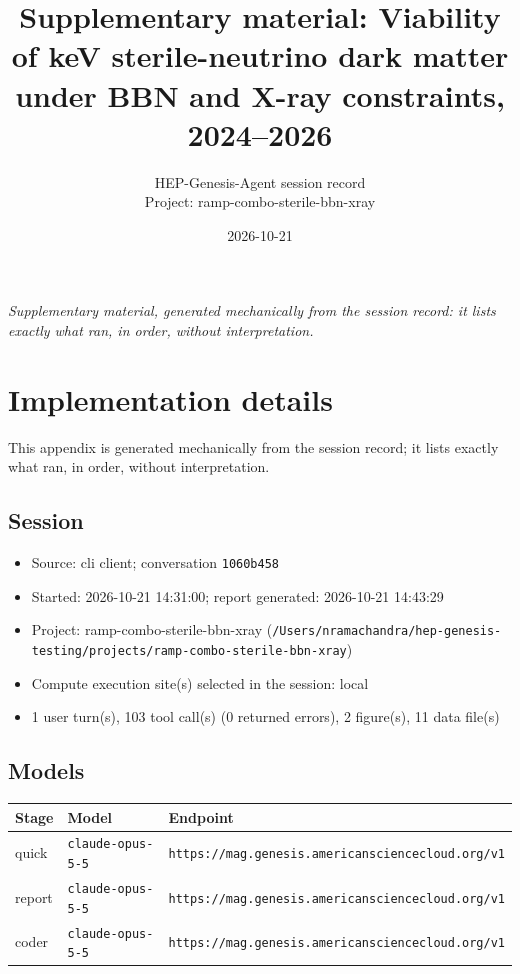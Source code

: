 \documentclass[11pt,a4paper]{article}
\title{Supplementary material: Viability of keV sterile-neutrino dark matter under BBN and X-ray constraints, 2024--2026}
\author{HEP-Genesis-Agent session record \\ \small Project: ramp-combo-sterile-bbn-xray}
\date{2026-10-21}
\begin{document}
\maketitle
\noindent\textit{\small Supplementary material, generated mechanically from the session record: it lists exactly what ran, in order, without interpretation.}
\vspace{1em}



\appendix
\section{Implementation details}
\label{app:impl}
This appendix is generated mechanically from the session record; it lists exactly what ran, in order, without interpretation.
\subsection{Session}
\begin{itemize}
  \item Source: cli client; conversation \texttt{1060b458}
  \item Started: 2026-10-21 14:31:00; report generated: 2026-10-21 14:43:29
  \item Project: ramp-combo-sterile-bbn-xray (\texttt{/\allowbreak{}Users/\allowbreak{}nramachandra/\allowbreak{}hep-genesis-testing/\allowbreak{}projects/\allowbreak{}ramp-combo-sterile-bbn-xray})
  \item Compute execution site(s) selected in the session: local
  \item 1 user turn(s), 103 tool call(s) (0 returned errors), 2 figure(s), 11 data file(s)
\end{itemize}
\subsection{Models}
\begin{longtable}{@{}p{}p{}p{}@{}}
\toprule Stage & Model & Endpoint \\ \midrule \endhead
quick & \texttt{claude-opus-5-5} & \texttt{https:\allowbreak{}/\allowbreak{}/\allowbreak{}mag.genesis.americansciencecloud.org/\allowbreak{}v1} \\
report & \texttt{claude-opus-5-5} & \texttt{https:\allowbreak{}/\allowbreak{}/\allowbreak{}mag.genesis.americansciencecloud.org/\allowbreak{}v1} \\
coder & \texttt{claude-opus-5-5} & \texttt{https:\allowbreak{}/\allowbreak{}/\allowbreak{}mag.genesis.americansciencecloud.org/\allowbreak{}v1} \\
\bottomrule\end{longtable}
\end{document}
